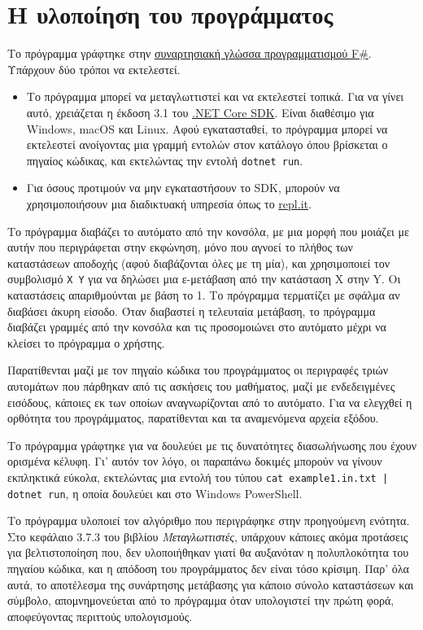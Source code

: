 \documentclass{article}
\begin{document}
\section{Η υλοποίηση του προγράμματος}

Το πρόγραμμα γράφτηκε στην \href{https://fsharp.org}{συναρτησιακή γλώσσα προγραμματισμού F\#}. Υπάρχουν δύο τρόποι να εκτελεστεί.

\begin{itemize}
    \item Το πρόγραμμα μπορεί να μεταγλωττιστεί και να εκτελεστεί τοπικά. Για να γίνει αυτό, χρειάζεται η έκδοση 3.1 του \href{https://dotnet.microsoft.com/download}{.NET Core SDK}. Είναι διαθέσιμο για Windows, macOS και Linux. Αφού εγκατασταθεί, το πρόγραμμα μπορεί να εκτελεστεί ανοίγοντας μια γραμμή εντολών στον κατάλογο όπου βρίσκεται ο πηγαίος κώδικας, και εκτελώντας την εντολή \texttt{dotnet run}.
    \item Για όσους προτιμούν να μην εγκαταστήσουν το SDK, μπορούν να χρησιμοποιήσουν μια διαδικτυακή υπηρεσία όπως το \href{https://repl.it/languages/fsharp}{repl.it}.
\end{itemize}

Το πρόγραμμα διαβάζει το αυτόματο από την κονσόλα, με μια μορφή που μοιάζει με αυτήν που περιγράφεται στην εκφώνηση, μόνο που αγνοεί το πλήθος των καταστάσεων αποδοχής (αφού διαβάζονται όλες με τη μία), και χρησιμοποιεί τον συμβολισμό \texttt{X Y} για να δηλώσει μια ε-μετάβαση από την κατάσταση X στην Y. Οι καταστάσεις απαριθμούνται με βάση το 1. Το πρόγραμμα τερματίζει με σφάλμα αν διαβάσει άκυρη είσοδο. Όταν διαβαστεί η τελευταία μετάβαση, το πρόγραμμα διαβάζει γραμμές από την κονσόλα και τις προσομοιώνει στο αυτόματο μέχρι να κλείσει το πρόγραμμα ο χρήστης.

Παρατίθενται μαζί με τον πηγαίο κώδικα του προγράμματος οι περιγραφές τριών αυτομάτων που πάρθηκαν από τις ασκήσεις του μαθήματος, μαζί με ενδεδειγμένες εισόδους, κάποιες εκ των οποίων αναγνωρίζονται από το αυτόματο. Για να ελεγχθεί η ορθότητα του προγράμματος, παρατίθενται και τα αναμενόμενα αρχεία εξόδου.

Το πρόγραμμα γράφτηκε για να δουλεύει με τις δυνατότητες διασωλήνωσης που έχουν ορισμένα κέλυφη. Γι' αυτόν τον λόγο, οι παραπάνω δοκιμές μπορούν να γίνουν εκπληκτικά εύκολα, εκτελώντας μια εντολή του τύπου \texttt{cat example1.in.txt | dotnet run}, η οποία δουλεύει και στο Windows PowerShell.

Το πρόγραμμα υλοποιεί τον αλγόριθμο που περιγράφηκε στην προηγούμενη ενότητα. Στο κεφάλαιο 3.7.3 του βιβλίου \textit{Μεταγλωττιστές}, υπάρχουν κάποιες ακόμα προτάσεις για βελτιστοποίηση που, δεν υλοποιήθηκαν γιατί θα αυξανόταν η πολυπλοκότητα του πηγαίου κώδικα, και η απόδοση του προγράμματος δεν είναι τόσο κρίσιμη. Παρ' όλα αυτά, το αποτέλεσμα της συνάρτησης μετάβασης για κάποιο σύνολο καταστάσεων και σύμβολο, απομνημονεύεται από το πρόγραμμα όταν υπολογιστεί την πρώτη φορά, αποφεύγοντας περιττούς υπολογισμούς.
\end{document}
